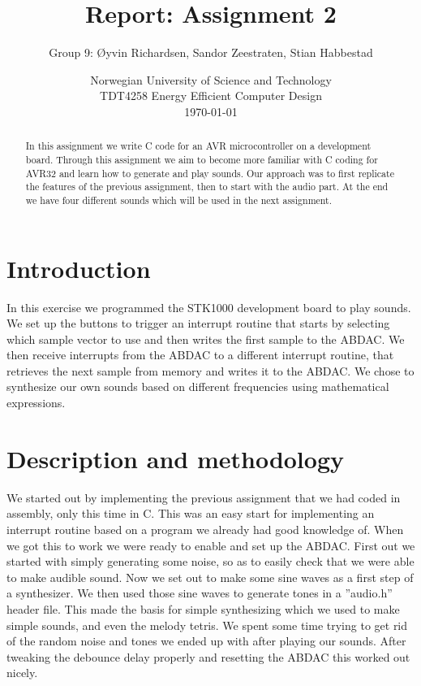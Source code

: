 \documentclass[a4paper,11pt]{article}
\title{\textbf{Report: Assignment 2}}
\author{Group 9: \O yvin Richardsen, Sandor Zeestraten, Stian Habbestad}
\date{{Norwegian University of Science and Technology \\
TDT4258 Energy Efficient Computer Design \\}
\today}
\begin{document}
\maketitle

\begin{abstract}
In this assignment we write C code for an AVR microcontroller on a development board. Through this assignment we aim to become more familiar with C coding for AVR32 and learn how to generate and play sounds. Our approach was to first replicate the features of the previous assignment, then to start with the audio part. At the end we have four different sounds which will be used in the next assignment.
\end{abstract}

\tableofcontents
\newpage

\section{Introduction}

In this exercise we programmed the STK1000 development board to play sounds. We set up the buttons to trigger an interrupt routine that starts by selecting which sample vector to use and then writes the first sample to the ABDAC. We then receive interrupts from the ABDAC to a different interrupt routine, that retrieves the next sample from memory and writes it to the ABDAC. We chose to synthesize our own sounds based on different frequencies using mathematical expressions. 


\section{Description and methodology}
We started out by implementing the previous assignment that we had coded in assembly, only this time in C. This was an easy start for implementing an interrupt routine based on a program we already had good knowledge of. When we got this to work we were ready to enable and set up the ABDAC. First out we started with simply generating some noise, so as to easily check that we were able to make audible sound. Now we set out to make some sine waves as a first step of a synthesizer. We then used those sine waves to generate tones in a ''audio.h'' header file. This made the basis for simple synthesizing which we used to make simple sounds, and even the melody tetris. 
We spent some time trying to get rid of the random noise and tones we ended up with after playing our sounds. After tweaking the debounce delay properly and resetting the ABDAC this worked out nicely.
\end{document}
